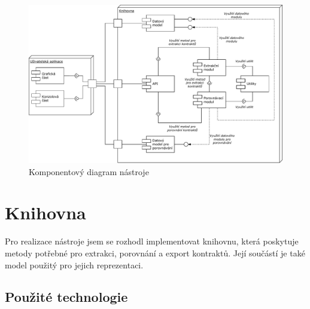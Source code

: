 	\begin{figure}[!htb]
			\centering
			\includegraphics[width=1\textwidth]{img/componentDiagram.pdf}
			\caption[componentDiagram]{Komponentový diagram nástroje}
			\label{componentDiagram}
		\endminipage\hfill
	\end{figure}		
	
	\section{Knihovna}
		Pro realizace nástroje jsem se rozhodl implementovat knihovnu, která poskytuje metody potřebné pro extrakci, porovnání a export kontraktů. Její součástí je také model použitý pro jejich reprezentaci. 

	    \subsection{Použité technologie}
	    
